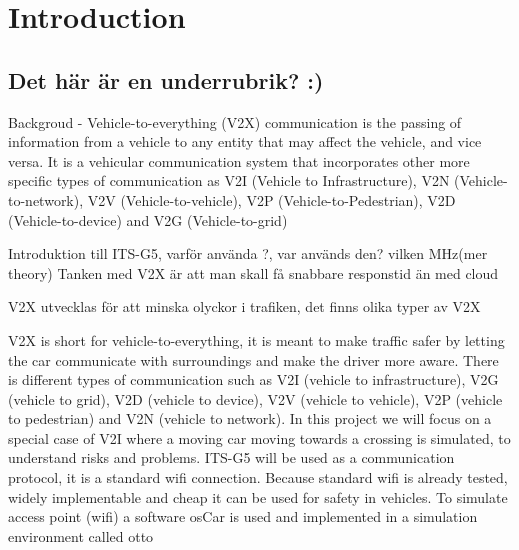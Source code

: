 \section{Introduction}
\subsection{Det här är en underrubrik? :)}
Backgroud - Vehicle-to-everything (V2X) communication is the passing of information from
a vehicle to any entity that may affect the vehicle, and vice versa. It is a vehicular
communication system that incorporates other more specific types of communication as 
V2I (Vehicle to Infrastructure), V2N (Vehicle-to-network), V2V (Vehicle-to-vehicle), V2P (Vehicle-to-Pedestrian), V2D (Vehicle-to-device) and V2G (Vehicle-to-grid) 

Introduktion till ITS-G5, varför använda ?, var används den? vilken MHz(mer theory)
Tanken med V2X är att man skall få snabbare responstid än med cloud 

V2X utvecklas för att minska olyckor i trafiken, det finns olika typer av V2X\bigskip



V2X is short for vehicle-to-everything, it is meant to make traffic safer by letting the car communicate with surroundings and make the driver more aware. There is different types of communication such as V2I (vehicle to infrastructure), V2G (vehicle to grid), V2D (vehicle to device), V2V (vehicle to vehicle), V2P (vehicle to pedestrian) and V2N (vehicle to network). In this project we will focus on a special case of V2I where a moving car moving towards a crossing is simulated, to understand risks and problems. ITS-G5 will be used as a communication protocol, it is a standard wifi connection. Because standard wifi is already tested, widely implementable and cheap it can be used for safety in vehicles. To simulate access point (wifi) a software osCar is used and implemented in a simulation environment called otto